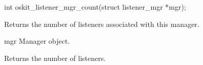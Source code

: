 \begin{apisyn}

	\funcproto int
	oskit_listener_mgr_count(struct listener_mgr *mgr);
\end{apisyn}
\begin{apidesc}
	Returns the number of listeners associated with this manager.
\end{apidesc}
\begin{apiparm}
	\item[mgr]
		Manager object.
\end{apiparm}
\begin{apiret}
	Returns the number of listeners.
\end{apiret}
